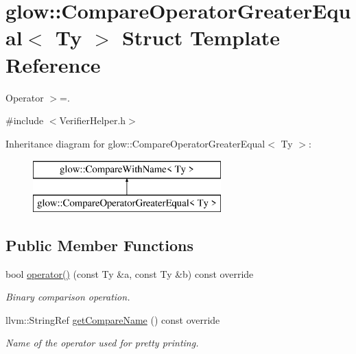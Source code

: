 \hypertarget{structglow_1_1_compare_operator_greater_equal}{}\section{glow\+:\+:Compare\+Operator\+Greater\+Equal$<$ Ty $>$ Struct Template Reference}
\label{structglow_1_1_compare_operator_greater_equal}


Operator $>$=.  




{\ttfamily \#include $<$Verifier\+Helper.\+h$>$}

Inheritance diagram for glow\+:\+:Compare\+Operator\+Greater\+Equal$<$ Ty $>$\+:\begin{figure}[H]
\begin{center}
\leavevmode
\includegraphics[height=2.000000cm]{structglow_1_1_compare_operator_greater_equal}
\end{center}
\end{figure}
\subsection*{Public Member Functions}
\begin{DoxyCompactItemize}
\item 
\mbox{\label{structglow_1_1_compare_operator_greater_equal_acfe8f01ea1b404ecee9853d600ccfb41}} 
bool \hyperlink{structglow_1_1_compare_operator_greater_equal_acfe8f01ea1b404ecee9853d600ccfb41}{operator()} (const Ty \&a, const Ty \&b) const override
\begin{DoxyCompactList}\small\item\em Binary comparison operation. \end{DoxyCompactList}\item 
\mbox{\label{structglow_1_1_compare_operator_greater_equal_a1a4d6af2561fe8a57aa9b5dc1363088d}} 
llvm\+::\+String\+Ref \hyperlink{structglow_1_1_compare_operator_greater_equal_a1a4d6af2561fe8a57aa9b5dc1363088d}{get\+Compare\+Name} () const override
\begin{DoxyCompactList}\small\item\em Name of the operator used for pretty printing. \end{DoxyCompactList}\end{DoxyCompactItemize}


